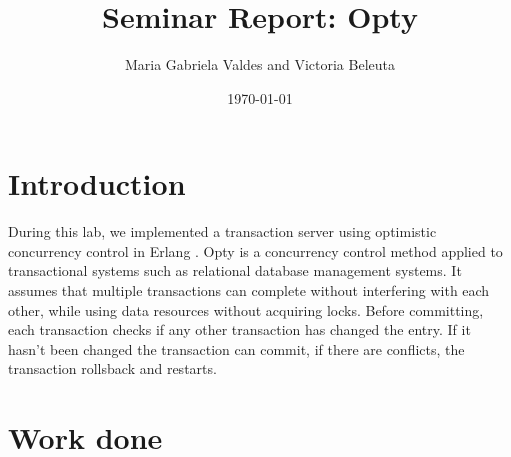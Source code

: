 \documentclass[a4paper, 11pt]{article}
\title{Seminar Report: Opty}
\author{Maria Gabriela Valdes and Victoria Beleuta}
\date{\today{}}
\begin{document}
\maketitle

\section{Introduction}

During this lab, we implemented a transaction server using optimistic concurrency control in Erlang . Opty is a concurrency control method applied to transactional systems such as relational database management systems. It assumes that multiple transactions can complete without interfering with each other, while using data resources without acquiring locks. Before committing, each transaction checks if any other transaction has changed the entry. If it hasn't been changed the transaction can commit, if there are conflicts, the transaction rollsback and restarts.
 
\section{Work done}
\end{document}
